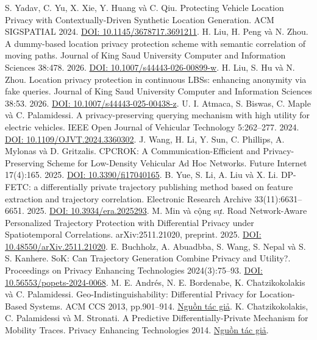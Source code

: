 S. Yadav, C. Yu, X. Xie, Y. Huang và C. Qiu. Protecting Vehicle Location Privacy with Contextually-Driven Synthetic Location Generation. ACM SIGSPATIAL 2024. \href{https://arxiv.org/abs/2409.09495}{DOI: 10.1145/3678717.3691211}.
 H. Liu, H. Peng và N. Zhou. A dummy-based location privacy protection scheme with semantic correlation of moving paths. Journal of King Saud University Computer and Information Sciences 38:478. 2026. \href{https://link.springer.com/article/10.1007/s44443-026-00899-w}{DOI: 10.1007/s44443-026-00899-w}.
 H. Liu, S. Hu và N. Zhou. Location privacy protection in continuous LBSs: enhancing anonymity via fake queries. Journal of King Saud University Computer and Information Sciences 38:53. 2026. \href{https://link.springer.com/article/10.1007/s44443-025-00438-z}{DOI: 10.1007/s44443-025-00438-z}.
 U. I. Atmaca, S. Biswas, C. Maple và C. Palamidessi. A privacy-preserving querying mechanism with high utility for electric vehicles. IEEE Open Journal of Vehicular Technology 5:262--277. 2024. \href{https://wrap.warwick.ac.uk/id/eprint/183198/}{DOI: 10.1109/OJVT.2024.3360302}.
 J. Wang, H. Li, Y. Sun, C. Phillips, A. Mylonas và D. Gritzalis. CPCROK: A Communication-Efficient and Privacy-Preserving Scheme for Low-Density Vehicular Ad Hoc Networks. Future Internet 17(4):165. 2025. \href{https://uhra.herts.ac.uk/id/eprint/25705/}{DOI: 10.3390/fi17040165}.
 B. Yue, S. Li, A. Liu và X. Li. DP-FETC: a differentially private trajectory publishing method based on feature extraction and trajectory correlation. Electronic Research Archive 33(11):6631--6651. 2025. \href{https://www.aimspress.com/article/doi/10.3934/era.2025293}{DOI: 10.3934/era.2025293}.
 M. Min và cộng sự. Road Network-Aware Personalized Trajectory Protection with Differential Privacy under Spatiotemporal Correlations. arXiv:2511.21020, preprint. 2025. \href{https://arxiv.org/abs/2511.21020}{DOI: 10.48550/arXiv.2511.21020}.
 E. Buchholz, A. Abuadbba, S. Wang, S. Nepal và S. S. Kanhere. SoK: Can Trajectory Generation Combine Privacy and Utility?. Proceedings on Privacy Enhancing Technologies 2024(3):75--93. \href{https://petsymposium.org/popets/2024/popets-2024-0068.pdf}{DOI: 10.56553/popets-2024-0068}.
 M. E. Andrés, N. E. Bordenabe, K. Chatzikokolakis và C. Palamidessi. Geo-Indistinguishability: Differential Privacy for Location-Based Systems. ACM CCS 2013, pp.901--914. \href{https://arxiv.org/abs/1212.1984}{Nguồn tác giả}.
 K. Chatzikokolakis, C. Palamidessi và M. Stronati. A Predictive Differentially-Private Mechanism for Mobility Traces. Privacy Enhancing Technologies 2014. \href{https://petsymposium.org/2014/papers/Chatzikokolakis.pdf}{Nguồn tác giả}.
